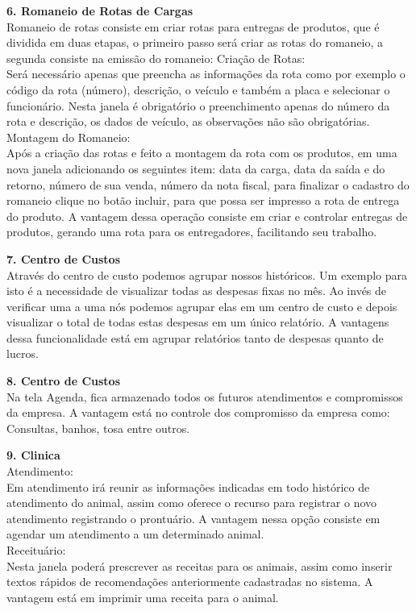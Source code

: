 \documentclass[12pt,openright,twoside,a4paper,english,french,spanish,brazil]{abntex2}
\begin{document}
\textbf{6.	{Romaneio de Rotas de Cargas}}\\
Romaneio de rotas consiste em criar rotas para entregas de produtos, que é dividida em duas etapas, o primeiro passo será criar as rotas do romaneio, a segunda consiste na emissão do romaneio:
Criação de Rotas:\\
Será necessário apenas que preencha as informações da rota como por exemplo o código da rota (número), descrição, o veículo e também a placa e selecionar o funcionário. Nesta janela é obrigatório o preenchimento apenas do número da rota e descrição, os dados de veículo, as observações não são obrigatórias.
Montagem do Romaneio:\\
Após a criação das rotas e feito a montagem da rota com os produtos, em uma nova janela adicionando os seguintes item: data da carga, data da saída e do retorno, número de sua venda, número da nota fiscal, para finalizar o cadastro do romaneio clique no botão incluir, para que possa ser impresso a rota de entrega do produto. A vantagem dessa operação consiste em criar e controlar entregas de produtos, gerando uma rota para os entregadores, facilitando seu trabalho.

\textbf{7.	{Centro de Custos }}\\
Através do centro de custo podemos agrupar nossos históricos. Um exemplo para isto é a necessidade de visualizar todas as despesas fixas no mês. Ao invés de verificar uma a uma nós podemos agrupar elas em um centro de custo e depois visualizar o total de todas estas despesas em um único relatório. A vantagens dessa funcionalidade está em agrupar relatórios tanto de despesas quanto de lucros.

\textbf{8.	{Centro de Custos }}\\
Na tela Agenda, fica armazenado todos os futuros atendimentos e compromissos da empresa. A vantagem está no controle dos compromisso da empresa como: Consultas, banhos, tosa entre outros.

\textbf{9.	{Clinica}}\\
Atendimento:\\
Em atendimento irá reunir as informações indicadas em todo histórico de atendimento do animal, assim como oferece o recurso para registrar o novo atendimento registrando o prontuário. A vantagem nessa opção consiste em agendar um atendimento a um determinado animal.\\
Receituário:\\
Nesta janela poderá prescrever as receitas para os animais, assim como inserir textos rápidos de recomendações anteriormente cadastradas no sistema. A vantagem está em imprimir uma receita para o animal.
\end{document}

